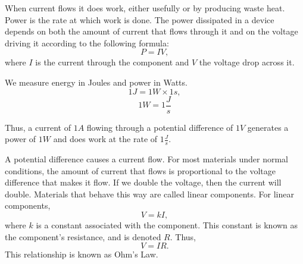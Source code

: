 \documentclass{article}
\begin{document}
    When current flows it does work, either usefully or by producing waste heat. Power is the rate at which work is done. The power dissipated in a device depends on both the amount of current that flows through it and on the voltage driving it according to the following formula: $$P = IV,$$ where $I$ is the current through the component and $V$ the voltage drop across it.

    We measure energy in Joules and power in Watts. $$1J = 1W \times 1s,$$ $$1W=1\frac Js$$

    Thus, a current of $1A$ flowing through a potential difference of $1V$ generates a power of $1W$ and does work at the rate of $1\frac Js$.

\medskip
{}

    A potential difference causes a current flow. For most materials under normal conditions, the amount of current that flows is proportional to the voltage difference that makes it flow. If we double the voltage, then the current will double. Materials that behave this way are called linear components. For linear components, $$V=kI,$$ where $k$ is a constant associated with the component. This constant is known as the component's resistance, and is denoted $R$. Thus, $$V=IR.$$ This relationship is known as Ohm's Law.

\medskip
\noindent{\bf }
\end{document}
